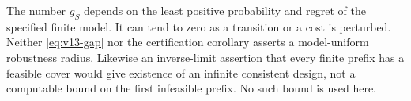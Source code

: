 \begin{remark}
The number $g_S$ depends on the least positive probability and regret
of the specified finite model. It can tend to zero as a transition or
a cost is perturbed. Neither \eqref{eq:v13-gap} nor the certification
corollary asserts a model-uniform robustness radius. Likewise an
inverse-limit assertion that every finite prefix has a feasible cover
would give existence of an infinite consistent design, not a computable
bound on the first infeasible prefix. No such bound is used here.
\end{remark}

